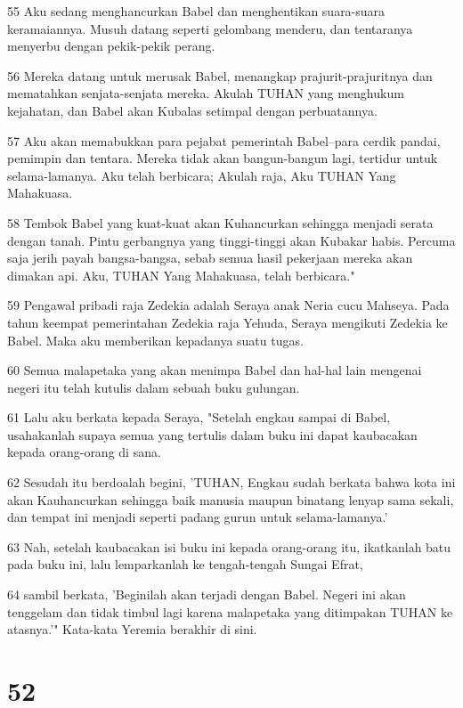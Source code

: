 \par 55 Aku sedang menghancurkan Babel dan menghentikan suara-suara keramaiannya. Musuh datang seperti gelombang menderu, dan tentaranya menyerbu dengan pekik-pekik perang.
\par 56 Mereka datang untuk merusak Babel, menangkap prajurit-prajuritnya dan mematahkan senjata-senjata mereka. Akulah TUHAN yang menghukum kejahatan, dan Babel akan Kubalas setimpal dengan perbuatannya.
\par 57 Aku akan memabukkan para pejabat pemerintah Babel--para cerdik pandai, pemimpin dan tentara. Mereka tidak akan bangun-bangun lagi, tertidur untuk selama-lamanya. Aku telah berbicara; Akulah raja, Aku TUHAN Yang Mahakuasa.
\par 58 Tembok Babel yang kuat-kuat akan Kuhancurkan sehingga menjadi serata dengan tanah. Pintu gerbangnya yang tinggi-tinggi akan Kubakar habis. Percuma saja jerih payah bangsa-bangsa, sebab semua hasil pekerjaan mereka akan dimakan api. Aku, TUHAN Yang Mahakuasa, telah berbicara."
\par 59 Pengawal pribadi raja Zedekia adalah Seraya anak Neria cucu Mahseya. Pada tahun keempat pemerintahan Zedekia raja Yehuda, Seraya mengikuti Zedekia ke Babel. Maka aku memberikan kepadanya suatu tugas.
\par 60 Semua malapetaka yang akan menimpa Babel dan hal-hal lain mengenai negeri itu telah kutulis dalam sebuah buku gulungan.
\par 61 Lalu aku berkata kepada Seraya, "Setelah engkau sampai di Babel, usahakanlah supaya semua yang tertulis dalam buku ini dapat kaubacakan kepada orang-orang di sana.
\par 62 Sesudah itu berdoalah begini, 'TUHAN, Engkau sudah berkata bahwa kota ini akan Kauhancurkan sehingga baik manusia maupun binatang lenyap sama sekali, dan tempat ini menjadi seperti padang gurun untuk selama-lamanya.'
\par 63 Nah, setelah kaubacakan isi buku ini kepada orang-orang itu, ikatkanlah batu pada buku ini, lalu lemparkanlah ke tengah-tengah Sungai Efrat,
\par 64 sambil berkata, 'Beginilah akan terjadi dengan Babel. Negeri ini akan tenggelam dan tidak timbul lagi karena malapetaka yang ditimpakan TUHAN ke atasnya.'" Kata-kata Yeremia berakhir di sini.

\chapter{52}

